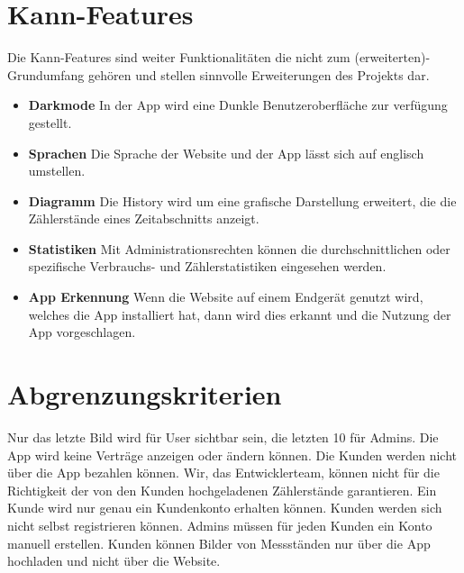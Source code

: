 \section{Kann-Features}
Die Kann-Features sind weiter Funktionalitäten die nicht zum (erweiterten)-Grundumfang gehören und stellen sinnvolle Erweiterungen des Projekts dar.
\begin{itemize}
\item  \textbf{Darkmode}
	In der App wird eine Dunkle Benutzeroberfläche zur verfügung gestellt.
\item \textbf{Sprachen}
	Die Sprache der Website und der App lässt sich auf englisch umstellen.
\item \textbf{Diagramm}
	Die History wird um eine grafische Darstellung erweitert, die die Zählerstände eines Zeitabschnitts anzeigt.
\item \textbf{Statistiken}
	Mit Administrationsrechten können die durchschnittlichen oder spezifische Verbrauchs- und Zählerstatistiken eingesehen werden.
\item \textbf{App Erkennung}
	Wenn die Website auf einem Endgerät genutzt wird, welches die App installiert hat, dann wird dies erkannt und
	die Nutzung der App vorgeschlagen.
\end{itemize}

\section{Abgrenzungskriterien}

Nur das letzte Bild wird für User sichtbar sein, die letzten 10 für Admins.
Die App wird keine Verträge anzeigen oder ändern können.
Die Kunden werden nicht über die App bezahlen können.
Wir, das Entwicklerteam, können nicht für die Richtigkeit der von den Kunden hochgeladenen Zählerstände garantieren.
Ein Kunde wird nur genau ein Kundenkonto erhalten können.
Kunden werden sich nicht selbst registrieren können. Admins müssen für jeden Kunden ein Konto manuell erstellen.
Kunden können Bilder von Messständen nur über die App hochladen und nicht über die Website.

